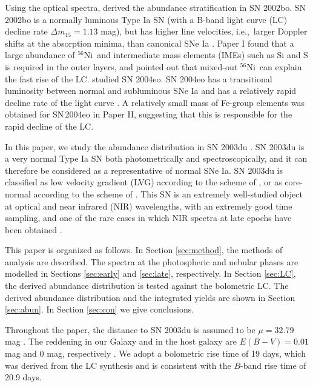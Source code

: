 \documentclass[usegraphicx,usenatbib]{mn2e}
\newcommand{\ie}{i.e.,\ }
\newcommand{\Nifs}{$^{56}$Ni}
\begin{document}
Using the optical spectra, \citet[Paper I]{stehle05} derived the abundance
stratification in SN 2002bo. SN 2002bo is a normally luminous Type Ia SN (with a
B-band light curve (LC) decline rate $\Delta m_{15} = 1.13$ mag), 
but has higher line
velocities, \ie larger Doppler shifts at the absorption minima, than canonical
SNe Ia \citep{benetti04}. Paper I found that a large abundance of \Nifs\ and
intermediate mass elements (IMEs) such as Si and S is required in the outer
layers, and pointed out that mixed-out \Nifs\ can explain the fast rise of the
LC. \citet[Paper II]{mazzali0804eo} studied SN 2004eo. SN 2004eo has a
transitional luminosity between normal and subluminous SNe Ia and has a
relatively rapid decline rate of the light curve 
\citep[$\Delta m_{15} = 1.46$ mag,][]{pastorello07}.  A relatively small mass of 
Fe-group elements was obtained for SN\,2004eo in Paper II, suggesting that this 
is responsible for the rapid decline of the LC.

In this paper, we study the abundance distribution in SN 2003du
\citep{gerardy04, anupama0503du, stanishev07, marion09NIR}. SN 2003du is a very
normal Type Ia SN both photometrically and spectroscopically, and it can
therefore be considered as a representative of normal SNe Ia. SN 2003du is
classified as low velocity gradient (LVG) according to the scheme of
\citet{benetti05}, or as core-normal according to the scheme of \citet{branch06,
branch07}. This SN is an extremely well-studied object at optical and near
infrared (NIR) wavelengths, with an extremely good time sampling,  and one of
the rare cases in which  NIR spectra at late epochs have been obtained
\citep{hoeflich04, motohara06}.

This paper is organized as follows. In Section \ref{sec:method}, the methods of
analysis are described. The spectra at the photospheric and nebular phases are
modelled in Sections \ref{sec:early} and \ref{sec:late}, respectively. In
Section \ref{sec:LC}, the derived abundance distribution is tested against the
bolometric LC. The derived abundance distribution and the integrated yields are
shown in Section \ref{sec:abun}. In Section \ref{sec:con} we give conclusions.

Throughout the paper, the distance to SN 2003du is assumed to be $\mu=32.79$ mag
\citep{stanishev07}. The reddening in our Galaxy and in the host galaxy are
$E(B-V)=0.01$ mag and $0$ mag, respectively \citep{stanishev07}. We adopt a
bolometric rise time of 19 days, which was derived from the LC synthesis
\citep{stanishev07} and is consistent with the $B$-band rise time of 20.9 days.
\end{document}
